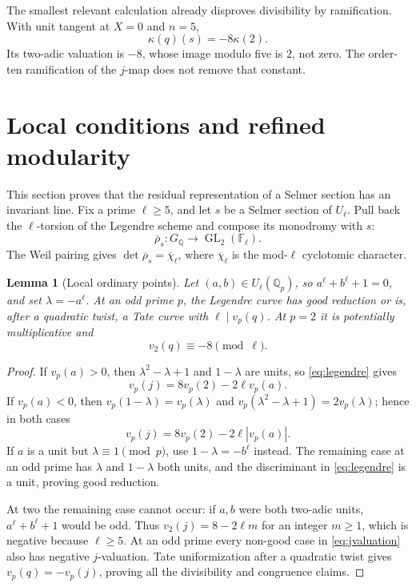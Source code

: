 \documentclass[11pt,a4paper]{article}
\newcommand{\Q}{\mathbb Q}
\newcommand{\F}{\mathbb F}
\DeclareMathOperator{\GL}{GL}
\theoremstyle{plain}
\newtheorem{lemma}[theorem]{Lemma}
\theoremstyle{definition}
\begin{document}
The smallest relevant calculation already disproves divisibility by
ramification. With unit tangent at $X=0$ and $n=5$,
\[
 \kappa(q)(s)=-8\kappa(2).
\]
Its two-adic valuation is $-8$, whose image modulo five is $2$, not
zero. The order-ten ramification of the $j$-map does not remove that
constant.

\section{Local conditions and refined modularity}\label{sec:modularity}

This section proves that the residual representation of a Selmer section
has an invariant line. Fix a prime $\ell\geq5$, and let $s$ be a Selmer
section of $U_\ell$. Pull back the $\ell$-torsion of the Legendre scheme
and compose its monodromy with $s$:
\[
 \overline\rho_s:G_\Q\longrightarrow\GL_2(\F_\ell).
\]
The Weil pairing gives $\det\overline\rho_s=\overline\chi_\ell$, where
$\overline\chi_\ell$ is the mod-$\ell$ cyclotomic character.

\begin{lemma}[Local ordinary points]\label{lem:local-points}
Let $(a,b)\in U_\ell(\Q_p)$, so $a^\ell+b^\ell+1=0$, and set
$\lambda=-a^\ell$. At an odd prime $p$, the Legendre curve has good
reduction or is, after a quadratic twist, a Tate curve with
$\ell\mid v_p(q)$. At $p=2$ it is potentially multiplicative and
\[
 v_2(q)\equiv-8\pmod\ell.
\]
\end{lemma}
\begin{proof}
If $v_p(a)>0$, then $\lambda^2-\lambda+1$ and $1-\lambda$ are units,
so \eqref{eq:legendre} gives
\[
 v_p(j)=8v_p(2)-2\ell v_p(a).
\]
If $v_p(a)<0$, then
$v_p(1-\lambda)=v_p(\lambda)$ and
$v_p(\lambda^2-\lambda+1)=2v_p(\lambda)$; hence in both cases
\begin{equation}\label{eq:jvaluation}
 v_p(j)=8v_p(2)-2\ell|v_p(a)|.
\end{equation}
If $a$ is a unit but $\lambda\equiv1\pmod p$, use
$1-\lambda=-b^\ell$ instead. The remaining case at an odd prime has
$\lambda$ and $1-\lambda$ both units, and the discriminant in
\eqref{eq:legendre} is a unit, proving good reduction.

At two the remaining case cannot occur: if $a,b$ were both two-adic
units, $a^\ell+b^\ell+1$ would be odd. Thus
$v_2(j)=8-2\ell m$ for an integer $m\geq1$, which is negative because
$\ell\geq5$. At an odd prime every non-good case in
\eqref{eq:jvaluation} also has negative $j$-valuation. Tate
uniformization after a quadratic twist gives
$v_p(q)=-v_p(j)$, proving all the divisibility and congruence claims.
\end{proof}
\end{document}
